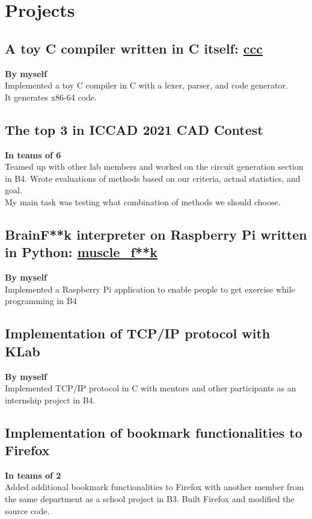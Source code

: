 \documentclass[10pt]{article}
\begin{document}
\section*{Projects}
  \subsection*{A toy C compiler written in C itself: \href{https://github.com/diohabara/ccc}{ccc}}
    \textbf{By myself}
    \\
    Implemented a toy C compiler in C with a lexer, parser, and code generator.
    \\
    It generates x86-64 code.
  \subsection*{The top 3 in ICCAD 2021 CAD Contest}
    \textbf{In teams of 6}
    \\
    Teamed up with other lab members and worked on the circuit generation section in B4.
    Wrote evaluations of methods based on our criteria, actual statistics, and goal.
    \\
    My main task was testing what combination of methods we should choose.
  \subsection*{BrainF**k interpreter on Raspberry Pi written in Python: \href{https://github.com/diohabara/muscle_fuck}{muscle\_f**k}}
    \textbf{By myself}
    \\
    Implemented a Raspberry Pi application to enable people to get exercise while programming in B4
  \subsection*{Implementation of TCP/IP protocol with KLab}
    \textbf{By myself}
    \\
    Implemented TCP/IP protocol in C with mentors and other participants as an internship project in B4.
  \subsection*{Implementation of bookmark functionalities to Firefox}
    \textbf{In teams of 2}
    \\
    Added additional bookmark functionalities to Firefox with another member from the same department as a school project in B3.
    Built Firefox and modified the source code.
\end{document}
